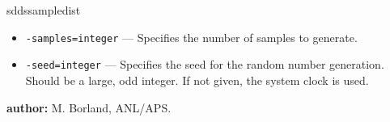 \begin{sddsprog}{sddssampledist}
\begin{itemize}
      \item \verb|-samples=integer| --- Specifies the number of samples to generate.
      \item \verb|-seed=integer| --- Specifies the seed for the random number generation. Should be a large, odd integer. If not given, the system clock is used.
    \end{itemize}
  \item \textbf{author:} M. Borland, ANL/APS.
\end{sddsprog}

